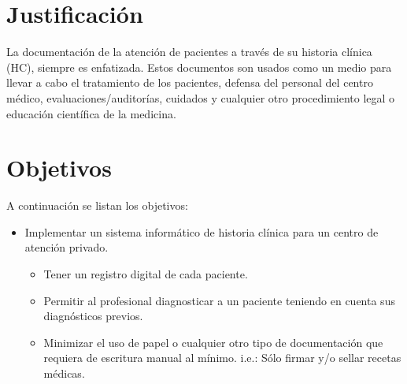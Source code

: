 \documentclass[a4paper, 10pt, oneside]{book}
\title{\THETITLE}
\author{Lescano, Juan Pablo A.}
\date{2018}
\begin{document}
    

    \begin{abstract}
        Se presenta un
        \begin{keywords}
            key1, key2
        \end{keywords}
    \end{abstract}
    \pagebreak

    \small{\tableofcontents}
    \pagebreak


    \section{Justificación}\label{sec:justificación}
    La documentación de la atención de pacientes a través de su historia clínica (HC), siempre es enfatizada.
    Estos documentos son usados como un medio para llevar a cabo el tratamiento de los pacientes, defensa del personal del centro médico, evaluaciones/auditorías, cuidados y cualquier otro procedimiento legal o educación científica de la medicina.



    \section{Objetivos}\label{sec:objetivos}

    A continuación se listan los objetivos:

    \item \begin{itemize}
        \item Implementar un sistema informático de historia clínica para un centro de atención privado.
        \begin{itemize}
            \item Tener un registro digital de cada paciente.
            \item Permitir al profesional diagnosticar a un paciente teniendo en cuenta sus diagnósticos previos.
            \item Minimizar el uso de papel o cualquier otro tipo de documentación que requiera de escritura manual al mínimo.
            i.e.: Sólo firmar y/o sellar recetas médicas.
        \end{itemize}
    \end{itemize}
\end{document}
